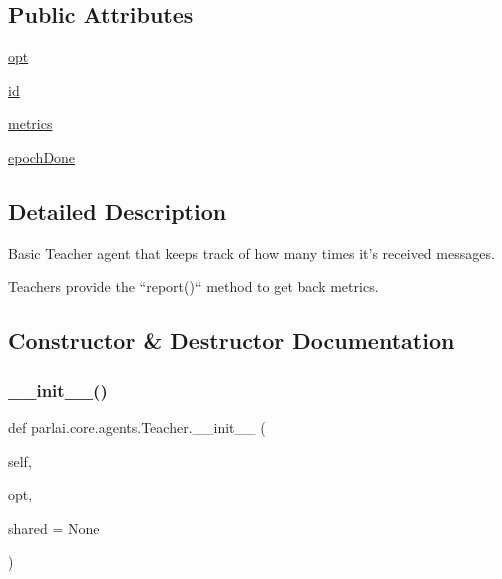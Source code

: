 \subsection*{Public Attributes}
\begin{DoxyCompactItemize}
\item 
\hyperlink{classparlai_1_1core_1_1agents_1_1Teacher_a3ce6243860ce978a897922863ed32fa4}{opt}
\item 
\hyperlink{classparlai_1_1core_1_1agents_1_1Teacher_a8385159acf54471fee8887ba2a83b53c}{id}
\item 
\hyperlink{classparlai_1_1core_1_1agents_1_1Teacher_a159705efe2a9f389d8adfdad76891f08}{metrics}
\item 
\hyperlink{classparlai_1_1core_1_1agents_1_1Teacher_a2a21915f2270b76ba0e99137d506af89}{epoch\+Done}
\end{DoxyCompactItemize}


\subsection{Detailed Description}
\begin{DoxyVerb}Basic Teacher agent that keeps track of how many times it's received messages.

Teachers provide the ``report()`` method to get back metrics.
\end{DoxyVerb}
 

\subsection{Constructor \& Destructor Documentation}
\mbox{\label{classparlai_1_1core_1_1agents_1_1Teacher_ab15a6b5c801681b96bcb9725df0c7c7d}} 
\subsubsection{\texorpdfstring{\+\_\+\+\_\+init\+\_\+\+\_\+()}{\_\_init\_\_()}}
{\footnotesize\ttfamily def parlai.\+core.\+agents.\+Teacher.\+\_\+\+\_\+init\+\_\+\+\_\+ (\begin{DoxyParamCaption}\item[{}]{self,  }\item[{}]{opt,  }\item[{}]{shared = {\ttfamily None} }\end{DoxyParamCaption})}



